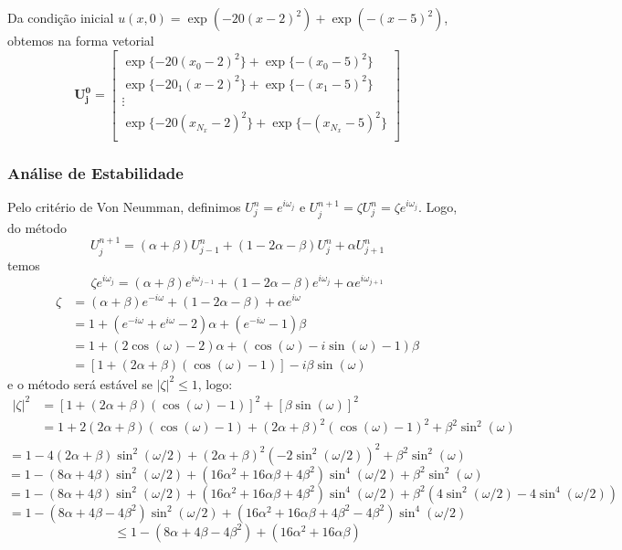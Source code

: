 \documentclass[12pt, a4paper]{article}
\renewcommand{\bf}[1]{\mathbf{#1}}
\begin{document}
    Da condição inicial $u(x,0) = \exp(-20{(x-2)}^2)+\exp(-{(x-5)}^2)$, obtemos na forma vetorial
    \[\bf{U_j^0} = \begin{bmatrix}
        \exp\{-20{(x_0-2)}^2\}+\exp\{-{(x_0-5)}^2\}\\
        \exp\{-20{_1(x-2)}^2\}+\exp\{-{(x_1-5)}^2\}\\
        \vdots\\
        \exp\{-20{(x_{N_x}-2)}^2\}+\exp\{-{(x_{N_x}-5)}^2\}\\
    \end{bmatrix}\]
    
    \newpage

    \subsubsection{Análise de Estabilidade}
    Pelo critério de Von Neumman, definimos $U_j^n = e^{i\omega_j}$ e $U_j^{n+1} = \zeta U_j^n = \zeta e^{i\omega_j}$. Logo, do método
    \[U_j^{n+1} = (\alpha+\beta)U_{j-1}^n + (1-2\alpha-\beta)U_j^n + \alpha U_{j+1}^n\]
    temos
    \[\zeta e^{i\omega_j} = (\alpha+\beta) e^{i\omega_{j-1}} + (1-2\alpha-\beta)e^{i\omega_j} + \alpha e^{i\omega_{j+1}}\]
    \[\begin{split}
        \zeta &= (\alpha+\beta) e^{-i\omega} + (1-2\alpha-\beta) + \alpha e^{i\omega}\\
        &= 1 + (e^{-i\omega}+e^{i\omega} - 2)\alpha + (e^{-i\omega} - 1)\beta\\
        &= 1 + (2\cos(\omega) - 2)\alpha + (\cos(\omega)-i\sin(\omega) - 1)\beta\\
        &= [1+(2\alpha+\beta)(\cos(\omega)-1)] - i \beta\sin(\omega)
    \end{split}\]
    e o método será estável se $|\zeta|^2 \leq 1$, logo:
    \[\begin{split}
        |\zeta|^2 &= {[1+(2\alpha+\beta)(\cos(\omega)-1)]}^2 + {[\beta\sin(\omega)]}^2\\
        &= 1 + 2(2\alpha+\beta)(\cos(\omega)-1) + {(2\alpha+\beta)}^2{(\cos(\omega)-1)}^2 + \beta^2\sin^2(\omega)\\
    \end{split}\]
    \[= 1 - 4(2\alpha+\beta)\sin^2(\omega/2) + {(2\alpha+\beta)}^2{(-2\sin^2(\omega/2))}^2 + \beta^2\sin^2(\omega)\]
    \[= 1 - (8\alpha+4\beta)\sin^2(\omega/2) + (16\alpha^2+16\alpha\beta+4\beta^2)\sin^4(\omega/2) + \beta^2\sin^2(\omega)\]
    \[= 1 - (8\alpha+4\beta)\sin^2(\omega/2) + (16\alpha^2+16\alpha\beta+4\beta^2)\sin^4(\omega/2) + \beta^2(4\sin^2(\omega/2)-4\sin^4(\omega/2))\]
    \[= 1 - (8\alpha+4\beta-4\beta^2)\sin^2(\omega/2) + (16\alpha^2+16\alpha\beta+4\beta^2-4\beta^2)\sin^4(\omega/2)\]
    \[\leq 1 - (8\alpha+4\beta-4\beta^2) + (16\alpha^2+16\alpha\beta)\]
\end{document}
